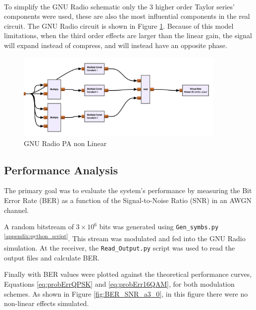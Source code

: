 \paragraph{}
To simplify the GNU Radio schematic only the 3 higher order Taylor series' components were 
used, these are also the most influential components in the real circuit. The GNU Radio 
circuit is shown in Figure \ref{fig:PA_non_lin}. Because of this model limitations, when the third order effects are larger than the linear gain, the signal will expand instead of compress, and will instead have an opposite phase.

\begin{figure}[H]
    \centering
    \includegraphics*[width=0.9\textwidth]{Images/PA_non_lin.png}
    \caption{GNU Radio PA non Linear}
    \label{fig:PA_non_lin}
\end{figure}

\subsection{Performance Analysis}

The primary goal was to evaluate the system's performance by measuring the Bit Error Rate (BER) as a function of the Signal-to-Noise Ratio (SNR) in an AWGN channel.

A random bitstream of $3 \times 10^6$ bits was generated using \texttt{Gen\_symbs.py} \textsuperscript{\ref{appendix:python_script}}. This stream was modulated and fed into the GNU Radio simulation. At the receiver, the \texttt{Read\_Output.py} script was used to read the output files and calculate BER.

Finally with BER values were plotted against the theoretical performance curves, Equations \ref{eq:probErrQPSK} and \ref{eq:probErr16QAM}, for both modulation schemes. As shown in Figure \ref{fig:BER_SNR_a3_0}, in this figure there were no non-linear effects simulated.

